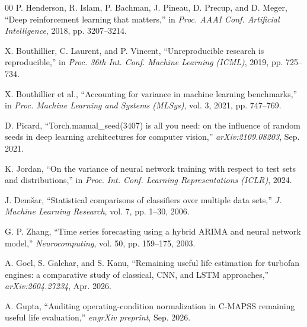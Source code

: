 \documentclass[conference]{IEEEtran}
\begin{document}
\begin{thebibliography}{00}
 P. Henderson, R. Islam, P. Bachman, J. Pineau, D. Precup, and D. Meger, ``Deep reinforcement learning that matters,'' in \emph{Proc. AAAI Conf. Artificial Intelligence}, 2018, pp. 3207--3214.

 X. Bouthillier, C. Laurent, and P. Vincent, ``Unreproducible research is reproducible,'' in \emph{Proc. 36th Int. Conf. Machine Learning (ICML)}, 2019, pp. 725--734.

 X. Bouthillier et al., ``Accounting for variance in machine learning benchmarks,'' in \emph{Proc. Machine Learning and Systems (MLSys)}, vol. 3, 2021, pp. 747--769.

 D. Picard, ``Torch.manual\_seed(3407) is all you need: on the influence of random seeds in deep learning architectures for computer vision,'' \emph{arXiv:2109.08203}, Sep. 2021.

 K. Jordan, ``On the variance of neural network training with respect to test sets and distributions,'' in \emph{Proc. Int. Conf. Learning Representations (ICLR)}, 2024.

 J. Dem\v{s}ar, ``Statistical comparisons of classifiers over multiple data sets,'' \emph{J. Machine Learning Research}, vol. 7, pp. 1--30, 2006.

 G. P. Zhang, ``Time series forecasting using a hybrid ARIMA and neural network model,'' \emph{Neurocomputing}, vol. 50, pp. 159--175, 2003.

 A. Goel, S. Galchar, and S. Kanu, ``Remaining useful life estimation for turbofan engines: a comparative study of classical, CNN, and LSTM approaches,'' \emph{arXiv:2604.27234}, Apr. 2026.

 A. Gupta, ``Auditing operating-condition normalization in C-MAPSS remaining useful life evaluation,'' \emph{engrXiv preprint}, Sep. 2026.

\end{thebibliography}
\end{document}
